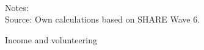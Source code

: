 \documentclass[10pt, letterpaper]{article}
\begin{document}
\begin{spacing}{1.4}
\begin{spacing}{.9}
\begin{spacing}{.9}
\centering 
\begin{scriptsize} 
	 
      \label{StatEdu} 
\end{scriptsize}
\end{spacing}


\begin{spacing}{.9}
\centering 
\begin{scriptsize} 
	 
      \label{StatHealth} 
\end{scriptsize}
\end{spacing}


\begin{figure}[H]
\centering
\caption{Income and volunteering} 
\label{fig:casp_ols}
\begin{minipage}{1\linewidth}
\quad
{}~\\ 
{\footnotesize Notes: }~\\
{\footnotesize Source: Own calculations based on SHARE Wave 6.}
\end{minipage}
\end{figure} 


\end{spacing}
\end{spacing}
\end{document}
